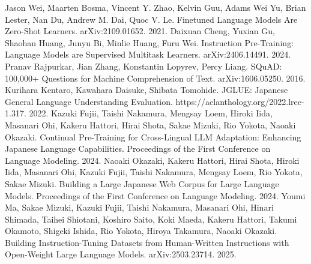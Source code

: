 \documentclass[twocolumn]{jsarticle}
\begin{document}
\begin{thebibliography}{99}
  Jason Wei, Maarten Bosma, Vincent Y. Zhao, Kelvin Guu, Adams Wei Yu, Brian Lester, Nan Du, Andrew M. Dai, Quoc V. Le. Finetuned Language Models Are Zero-Shot Learners. arXiv:2109.01652. 2021.
  Daixuan Cheng, Yuxian Gu, Shaohan Huang, Junyu Bi, Minlie Huang, Furu Wei. Instruction Pre-Training: Language Models are Supervised Multitask Learners. arXiv:2406.14491. 2024.
  Pranav Rajpurkar, Jian Zhang, Konstantin Lopyrev, Percy Liang. SQuAD: 100,000+ Questions for Machine Comprehension of Text. arXiv:1606.05250. 2016.
  Kurihara Kentaro, Kawahara Daisuke, Shibata Tomohide. JGLUE: Japanese General Language Understanding Evaluation. https://aclanthology.org/2022.lrec-1.317. 2022.
  Kazuki Fujii, Taishi Nakamura, Mengsay Loem, Hiroki Iida, Masanari Ohi, Kakeru Hattori, Hirai Shota, Sakae Mizuki, Rio Yokota, Naoaki Okazaki. Continual Pre-Training for Cross-Lingual LLM Adaptation: Enhancing Japanese Language Capabilities. Proceedings of the First Conference on Language Modeling. 2024.
  Naoaki Okazaki, Kakeru Hattori, Hirai Shota, Hiroki Iida, Masanari Ohi, Kazuki Fujii, Taishi Nakamura, Mengsay Loem, Rio Yokota, Sakae Mizuki. Building a Large Japanese Web Corpus for Large Language Models. Proceedings of the First Conference on Language Modeling. 2024.
  Youmi Ma, Sakae Mizuki, Kazuki Fujii, Taishi Nakamura, Masanari Ohi, Hinari Shimada, Taihei Shiotani, Koshiro Saito, Koki Maeda, Kakeru Hattori, Takumi Okamoto, Shigeki Ishida, Rio Yokota, Hiroya Takamura, Naoaki Okazaki. Building Instruction-Tuning Datasets from Human-Written Instructions with Open-Weight Large Language Models. arXiv:2503.23714. 2025.
\end{thebibliography}
\end{document}
